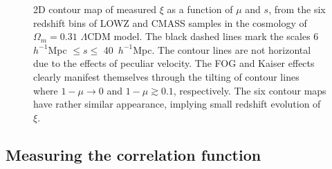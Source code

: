 \documentclass[iop]{emulateapj}
\begin{document}
\begin{figure}
   \caption{
    \label{fig_2pcfcon} 
    2D contour map of measured $\xi$ as a function of $\mu$ and $s$, from the six redshift bins of LOWZ and CMASS samples 
      in the cosmology of $\Omega_m=0.31$ $\Lambda$CDM model.
    The black dashed lines mark the scales 6\ $h^{-1}$Mpc $\leq s\leq$ 40\ $h^{-1}$Mpc.
    The contour lines are not horizontal due to the effects of peculiar velocity.
    The FOG and Kaiser effects clearly manifest themselves through the tilting of contour 
     lines where $1-\mu \rightarrow 0$ and $1-\mu \gtrsim0.1$, respectively.
    The six contour maps have rather similar appearance, implying small redshift evolution of $\xi$.
   }
\end{figure}



\subsection{Measuring the correlation function}
\end{document}
